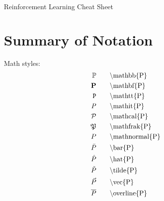 \documentclass[10pt, landscape, a4paper]{article}
\begin{document}
    \raggedright
    \fontsize{\textfontsize}{\textfontsize}\selectfont

    \begin{multicols}{3}
        \setlength{\premulticols}{1pt}
        \setlength{\postmulticols}{0.1pt}
        \setlength{\multicolsep}{1pt}
        \setlength{\columnsep}{1pt}

        \begin{center}
            \Large{Reinforcement Learning Cheat Sheet} \\
        \end{center}

        \section*{Summary of Notation}
         {
            Math styles:
            \begin{align*}
                \mathbb{P}     &\qquad \text{\textbackslash mathbb\{P\}}     \\
                \mathbf{P}     &\qquad \text{\textbackslash mathbf\{P\}}     \\
                \mathtt{P}     &\qquad \text{\textbackslash mathtt\{P\}}     \\
                \mathit{P}     &\qquad \text{\textbackslash mathit\{P\}}     \\
                \mathcal{P}    &\qquad \text{\textbackslash mathcal\{P\}}    \\
                \mathfrak{P}   &\qquad \text{\textbackslash mathfrak\{P\}}   \\
                \mathnormal{P} &\qquad \text{\textbackslash mathnormal\{P\}} \\
                \bar{P}        &\qquad \text{\textbackslash bar\{P\}}        \\
                \hat{P}        &\qquad \text{\textbackslash hat\{P\}}        \\
                \tilde{P}      &\qquad \text{\textbackslash tilde\{P\}}      \\
                \vec{P}        &\qquad \text{\textbackslash vec\{P\}}        \\
                \overline{P}   &\qquad \text{\textbackslash overline\{P\}}   \\
            \end{align*}
        } {}


\end{multicols}
\end{document}
